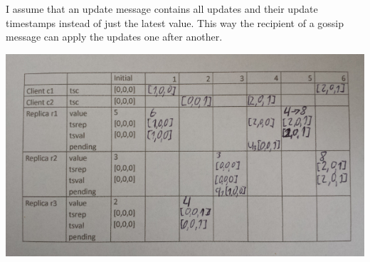 \documentclass[10pt,a4paper]{article}
\begin{document}
I assume that an update message contains all updates and their update timestamps instead of just the latest value.
This way the recipient of a gossip message can apply the updates one after another.

\includegraphics[width=\textwidth]{sheet-6/exercise-3-a}
\end{document}
